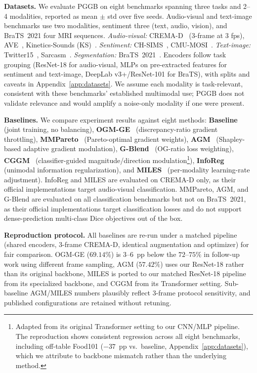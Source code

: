 \documentclass{article}
\begin{document}
\textbf{Datasets.}
We evaluate PGGB on eight benchmarks spanning three tasks and 2--4 modalities, reported as mean $\pm$ std over five seeds. Audio-visual and text-image benchmarks use two modalities, sentiment three (text, audio, vision), and BraTS~2021 four MRI sequences. \emph{Audio-visual:} CREMA-D~\citep{cao2014cremad} (3-frame at 3 fps), AVE~\citep{tian2018ave}, Kinetics-Sounds (KS)~\citep{arandjelovic2017kinetics}. \emph{Sentiment:} CH-SIMS~\citep{yu2020chsims}, CMU-MOSI~\citep{zadeh2016mosi}. \emph{Text-image:} Twitter15~\citep{yu2019tombert, zhang2018adaptive}, Sarcasm~\citep{cai2019sarcasm}. \emph{Segmentation:} BraTS~2021~\citep{baid2021brats}. Encoders follow task grouping (ResNet-18 for audio-visual, MLPs on pre-extracted features for sentiment and text-image, DeepLab v3+/ResNet-101 for BraTS), with splits and caveats in Appendix~\ref{app:datasets}. We assume each modality is task-relevant, consistent with these benchmarks' established multimodal use; PGGB does not validate relevance and would amplify a noise-only modality if one were present.

\textbf{Baselines.}
\label{sec:baselines}
We compare experiment results against eight methods: \textbf{Baseline} (joint training, no balancing), \textbf{OGM-GE}~\citep{peng2022ogmge} (discrepancy-ratio gradient throttling), \textbf{MMPareto}~\citep{wei2024mmpareto} (Pareto-optimal gradient weights), \textbf{AGM}~\citep{li2023agm} (Shapley-based adaptive gradient modulation), \textbf{G-Blend}~\citep{wang2020gblending} (OG-ratio loss weighting), \textbf{CGGM}~\citep{guo2024cggm} (classifier-guided magnitude/direction modulation\footnote{Adapted from its original Transformer setting to our CNN/MLP pipeline. The reproduction shows consistent regression across all eight benchmarks, including off-table Food101 ($-37$~pp vs.\ baseline, Appendix~\ref{app:datasets}), which we attribute to backbone mismatch rather than the underlying method.}), \textbf{InfoReg}~\citep{huang2025inforeg} (unimodal information regularization), and \textbf{MILES}~\citep{guerra2025miles} (per-modality learning-rate adjustment). InfoReg and MILES are evaluated on CREMA-D only, as their official implementations target audio-visual classification. MMPareto, AGM, and G-Blend are evaluated on all classification benchmarks but not on BraTS~2021, as their official implementations target classification losses and do not support dense-prediction multi-class Dice objectives out of the box.

\textbf{Reproduction protocol.} All baselines are re-run under a matched pipeline (shared encoders, 3-frame CREMA-D, identical augmentation and optimizer) for fair comparison. OGM-GE ($69.14\%$) is $3$--$6$~pp below the $72$--$75\%$ in follow-up work using different frame sampling, AGM ($57.42\%$) uses our ResNet-18 rather than its original backbone, MILES is ported to our matched ResNet-18 pipeline from its specialized backbone, and CGGM from its Transformer setting. Sub-baseline AGM/MILES numbers plausibly reflect 3-frame protocol sensitivity, and published configurations are retained without retuning.
\end{document}
